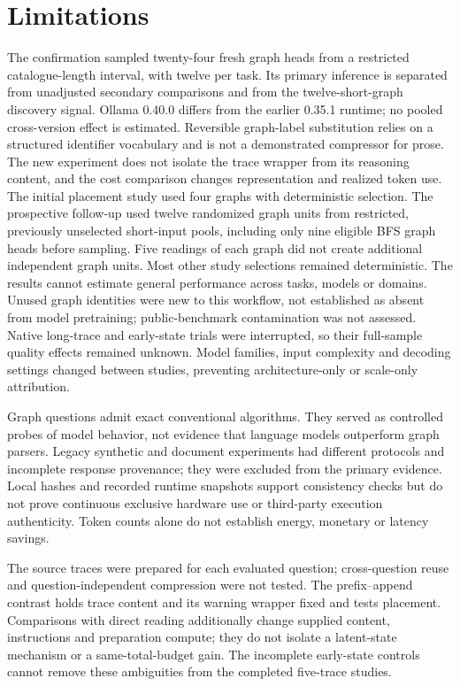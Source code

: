 \section{Limitations}
The confirmation sampled twenty-four fresh graph heads from a restricted catalogue-length interval, with twelve per task. Its primary inference is separated from unadjusted secondary comparisons and from the twelve-short-graph discovery signal. Ollama 0.40.0 differs from the earlier 0.35.1 runtime; no pooled cross-version effect is estimated. Reversible graph-label substitution relies on a structured identifier vocabulary and is not a demonstrated compressor for prose. The new experiment does not isolate the trace wrapper from its reasoning content, and the cost comparison changes representation and realized token use.
The initial placement study used four graphs with deterministic selection. The prospective follow-up used twelve randomized graph units from restricted, previously unselected short-input pools, including only nine eligible BFS graph heads before sampling. Five readings of each graph did not create additional independent graph units. Most other study selections remained deterministic. The results cannot estimate general performance across tasks, models or domains. Unused graph identities were new to this workflow, not established as absent from model pretraining; public-benchmark contamination was not assessed. Native long-trace and early-state trials were interrupted, so their full-sample quality effects remained unknown. Model families, input complexity and decoding settings changed between studies, preventing architecture-only or scale-only attribution.

Graph questions admit exact conventional algorithms. They served as controlled probes of model behavior, not evidence that language models outperform graph parsers. Legacy synthetic and document experiments had different protocols and incomplete response provenance; they were excluded from the primary evidence. Local hashes and recorded runtime snapshots support consistency checks but do not prove continuous exclusive hardware use or third-party execution authenticity. Token counts alone do not establish energy, monetary or latency savings.

The source traces were prepared for each evaluated question; cross-question reuse and question-independent compression were not tested. The prefix--append contrast holds trace content and its warning wrapper fixed and tests placement. Comparisons with direct reading additionally change supplied content, instructions and preparation compute; they do not isolate a latent-state mechanism or a same-total-budget gain. The incomplete early-state controls cannot remove these ambiguities from the completed five-trace studies.

